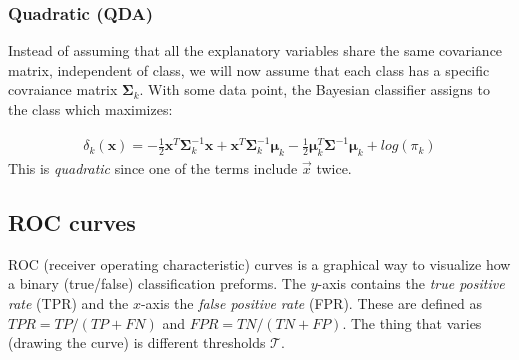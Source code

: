 \documentclass{article}
\renewcommand{\vec}[1]{\mathbf{#1}} %
\newcommand{\vecsym}[1]{\boldsymbol{#1}} %
\begin{document}
\subsubsection{Quadratic (QDA)}
Instead of assuming that all the explanatory variables share the same covariance matrix, independent of class, we will now assume that each class has a specific covraiance matrix $\vecsym{\Sigma}_k$. With some data point, the Bayesian classifier assigns to the class which maximizes:

\begin{align*}
    \delta_k (\vec{x}) = - \frac{1}{2} \vec{x}^T \vecsym{\Sigma}_k^{-1} \vecsym{x} +  \vecsym{x}^T \vecsym{\Sigma}_k^{-1} \vecsym{\mu}_k - \frac{1}{2}\vecsym{\mu}_k^T \vecsym{\Sigma}^{-1} \vecsym{\mu}_k + log(\pi_k)
\end{align*}
This is \textit{quadratic} since one of the terms include $\Vec{x}$ twice.

\subsection{ROC curves}

ROC (receiver operating characteristic) curves is a graphical way to visualize how a binary (true/false) classification preforms. The $y$-axis contains the \textit{true positive rate} (TPR) and the $x$-axis the \textit{false positive rate} (FPR). These are defined as $TPR = TP/(TP+FN)$ and $FPR = TN/(TN+FP)$. The thing that varies (drawing the curve) is different thresholds $\mathcal{T}$.
\end{document}
